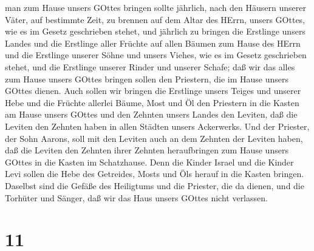 man zum Hause unsers GOttes bringen sollte jährlich, nach den Häusern
unserer Väter, auf bestimmte Zeit, zu brennen auf dem Altar des HErrn,
unsers GOttes, wie es im Gesetz geschrieben stehet,  und
jährlich zu bringen die Erstlinge unsers Landes und die Erstlinge aller
Früchte auf allen Bäumen zum Hause des HErrn  und die
Erstlinge unserer Söhne und unsers Viehes, wie es im Gesetz geschrieben
stehet, und die Erstlinge unserer Rinder und unserer Schafe; daß wir das
alles zum Hause unsers GOttes bringen sollen den Priestern, die im Hause
unsers GOttes dienen.  Auch sollen wir bringen die
Erstlinge unsers Teiges und unserer Hebe und die Früchte allerlei Bäume,
Most und Öl den Priestern in die Kasten am Hause unsers GOttes und den
Zehnten unsers Landes den Leviten, daß die Leviten den Zehnten haben in
allen Städten unsers Ackerwerks.  Und der Priester, der
Sohn Aarons, soll mit den Leviten auch an dem Zehnten der Leviten haben,
daß die Leviten den Zehnten ihrer Zehnten heraufbringen zum Hause unsers
GOttes in die Kasten im Schatzhause.  Denn die Kinder
Israel und die Kinder Levi sollen die Hebe des Getreides, Mosts und Öls
herauf in die Kasten bringen. Daselbst sind die Gefäße des Heiligtums
und die Priester, die da dienen, und die Torhüter und Sänger, daß wir
das Haus unsers GOttes nicht verlassen.

\hypertarget{section-10}{%
\section{11}\label{section-10}}

